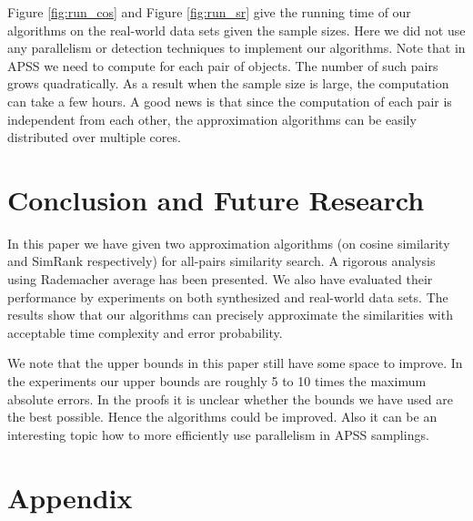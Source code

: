 \documentclass{article}
\begin{document}
Figure \ref{fig:run_cos} and Figure \ref{fig:run_sr} give the running time of our algorithms on the real-world data sets given the sample sizes. Here we did not use any parallelism or detection techniques to implement our algorithms. Note that in APSS we need to compute for each pair of objects. The number of such pairs grows quadratically. As a result when the sample size is large, the computation can take a few hours. A good news is that since the computation of each pair is independent from each other, the approximation algorithms can be easily distributed over multiple cores.

\section{Conclusion and Future Research}
\label{sec:con}
In this paper we have given two approximation algorithms (on cosine similarity and SimRank respectively) for all-pairs similarity search. 
A rigorous analysis using Rademacher average has been presented.
We also have evaluated their performance by experiments on both synthesized and real-world data sets. The results show that our algorithms can precisely approximate the similarities with acceptable time complexity and error probability. 

We note that the upper bounds in this paper still have some space to improve. In the experiments our upper bounds are roughly 5 to 10 times the maximum absolute errors. In the proofs it is unclear whether the bounds we have used are the best possible. Hence the algorithms could be improved. Also it can be an interesting topic how to more efficiently use parallelism in APSS samplings.

%



\section{Appendix}

\end{document}

